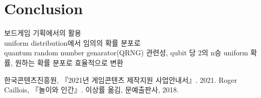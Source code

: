 \documentclass[11pt]{article}
\begin{document}
\section{Conclusion}
보드게임 기획에서의 활용\\
uniform distribution에서 임의의 확률 분포로\\
quantum random number genarator(QRNG) 관련성, qubit 당 2의 n승 uniform 확률, 원하는 확률 분포로 효율적으로 변환\\

\begin{thebibliography}{99}
한국콘텐츠진흥원, 『2021년 게임콘텐츠 제작지원 사업안내서』. 2021.
Roger Caillois, 『놀이와 인간』. 이상률 옮김, 문예출판사, 2018.

\end{thebibliography}
\end{document}
